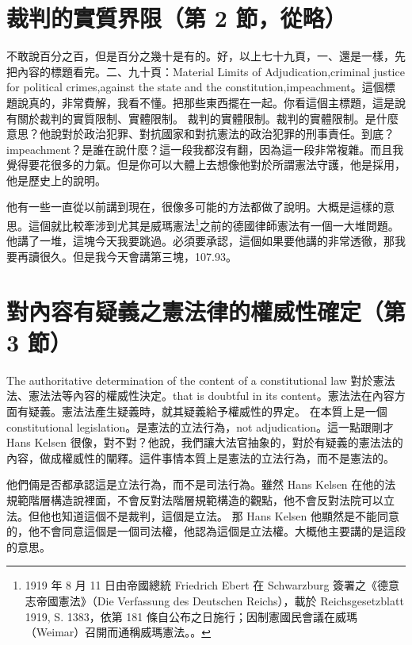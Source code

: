 \section{裁判的實質界限（第 2 節，從略）}

\hypertarget{w05:cue:207}{}不敢說百分之百，但是百分之幾十是有的。好，以上七十九頁，一、還是一樣，先把內容的標題看完。二、九十頁：Material Limits of Adjudication,criminal justice for political crimes,against the state and the constitution,impeachment。這個標題說真的，非常費解，我看不懂。把那些東西擺在一起。你看這個主標題，這是說有關於裁判的實質限制、實體限制。
\hypertarget{w05:cue:208}{}裁判的實體限制。裁判的實體限制。是什麼意思？他說對於政治犯罪、對抗國家和對抗憲法的政治犯罪的刑事責任。到底？impeachment？是誰在說什麼？這一段我都沒有翻，因為這一段非常複雜。而且我覺得要花很多的力氣。但是你可以大體上去想像他對於所謂憲法守護，他是採用，他是歷史上的說明。

\hypertarget{w05:cue:209}{}他有一些一直從以前講到現在，很像多可能的方法都做了說明。大概是這樣的意思。這個就比較牽涉到尤其是威瑪憲法\footnote{1919 年 8 月 11 日由帝國總統 Friedrich Ebert 在 Schwarzburg 簽署之《德意志帝國憲法》（Die Verfassung des Deutschen Reichs），載於 Reichsgesetzblatt 1919, S. 1383，依第 181 條自公布之日施行；因制憲國民會議在威瑪（Weimar）召開而通稱威瑪憲法。\cite{schmitt1931}。}之前的德國律師憲法有一個一大堆問題。他講了一堆，這塊今天我要跳過。必須要承認，這個如果要他講的非常透徹，那我要再讀很久。但是我今天會講第三塊，107.93。

\section{對內容有疑義之憲法律的權威性確定（第 3 節）}

\hypertarget{w05:cue:210}{}The authoritative determination of the content of a constitutional law 對於憲法法、憲法法等內容的權威性決定。that is doubtful in its content。憲法法在內容方面有疑義。憲法法產生疑義時，就其疑義給予權威性的界定。
\hypertarget{w05:cue:211}{}在本質上是一個 constitutional legislation。是憲法的立法行為，not adjudication。這一點跟剛才 Hans Kelsen 很像，對不對？他說，我們讓大法官抽象的，對於有疑義的憲法法的內容，做成權威性的闡釋。這件事情本質上是憲法的立法行為，而不是憲法的。

\hypertarget{w05:cue:212}{}他們倆是否都承認這是立法行為，而不是司法行為。雖然 Hans Kelsen 在他的法規範階層構造說裡面，不會反對法階層規範構造的觀點，他不會反對法院可以立法。但他也知道這個不是裁判，這個是立法。
\hypertarget{w05:cue:213}{}那 Hans Kelsen 他顯然是不能同意的，他不會同意這個是一個司法權，他認為這個是立法權。大概他主要講的是這段的意思。

